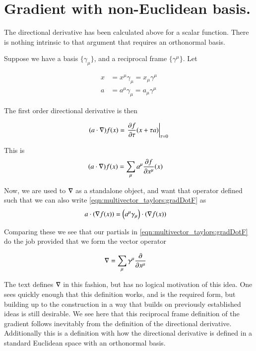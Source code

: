 \section{Gradient with non-Euclidean basis. }

The directional derivative has been calculated above for a scalar function.  There is nothing intrinsic to that argument
that requires an orthonormal basis.

Suppose we have a basis $\{\gamma_\mu\}$, and a reciprocal frame $\{\gamma^\mu\}$.  Let

\begin{align*}
x &= x^\mu \gamma_\mu = x_\mu \gamma^\mu \\
a &= a^\mu \gamma_\mu = a_\mu \gamma^\mu 
\end{align*}

The first order directional derivative is then 

\begin{align*}
(a \cdot \grad) f(x) 
&=
\left. \PD{\tau}{f}(x + \tau a) \right\vert_{\tau=0} \\
\end{align*}

This is
\begin{align}\label{eqn:multivector_taylors:gradDotF}
(a \cdot \grad) f(x) &= \sum_\mu a^\mu \PD{x^\mu}{f}(x) 
\end{align}

Now, we are used to $\grad$ as a standalone object, and want that operator defined such that we can also write \ref{eqn:multivector_taylors:gradDotF}
as
\begin{align*}
a \cdot (\grad f(x))
&=
\left(a^\mu \gamma_\mu \right) \cdot (\grad f(x))
\end{align*}

Comparing these we see that our partials in \ref{eqn:multivector_taylors:gradDotF} do the job provided that we form the vector operator

\begin{align}\label{eqn:multivector_taylors:gradForNonOrtho}
\grad &= \sum_\mu \gamma^\mu \PD{x^\mu}{}
\end{align}

The text \cite{doran2003gap} defines $\grad$ in this fashion, but has no logical motivation of this idea.  One sees
quickly enough that this definition works, and is the required form, but building up to the construction
in a way that builds on previously established ideas is still desirable.
We see here that this reciprocal frame definition of the gradient follows inevitably from the definition
of the directional derivative.  Additionally this is a definition with how 
the directional derivative is defined in a standard Euclidean space with an orthonormal basis.

